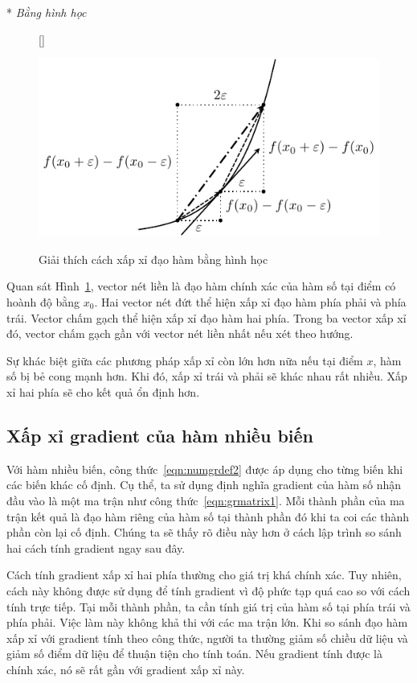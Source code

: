 \newpage
* \textit{Bằng hình học }

\begin{figure}[t]
[\FBwidth]
{\caption{
Giải thích cách xấp xỉ đạo hàm bằng hình học
}
\label{fig:explain_numgrad}}
{ %
\includegraphics[width=.6\textwidth]{Chapters/04_GradientDescent/GD/latex/check_grad.pdf}
}
\end{figure}

Quan sát Hình~\ref{fig:explain_numgrad}, vector nét liền là đạo hàm {chính xác}
của hàm số tại điểm có hoành độ bằng $x_0$. Hai vector nét đứt thể hiện xấp xỉ
đạo hàm phía phải và phía trái. Vector chấm gạch thể hiện xấp xỉ đạo hàm hai
phía. Trong ba vector xấp xỉ đó, vector chấm gạch gần với vector nét liền nhất
nếu xét theo hướng.

Sự khác biệt giữa các phương pháp xấp xỉ còn lớn hơn nữa nếu tại điểm $x$, hàm số bị
{bẻ cong} mạnh hơn. Khi đó, xấp xỉ trái và phải sẽ khác nhau rất nhiều.
Xấp xỉ hai phía sẽ cho kết quả ổn định hơn.


\subsection{Xấp xỉ gradient của hàm nhiều biến}

Với hàm nhiều biến, công thức~\eqref{eqn:numgrdef2} được áp dụng cho từng biến
khi các biến khác cố định. Cụ thể, ta sử dụng định nghĩa gradient của hàm số nhận
đầu vào là một ma trận như công thức~\eqref{eqn:grmatrix1}. Mỗi thành phần của
ma trận kết quả là đạo hàm riêng của hàm số tại thành phần đó khi ta coi các thành
phần còn lại cố định. Chúng ta sẽ thấy rõ điều này hơn ở cách lập trình so sánh
hai cách tính gradient ngay sau đây.

Cách tính gradient xấp xỉ hai phía thường cho giá trị khá chính xác. Tuy nhiên,
cách này không được sử dụng để tính gradient vì độ phức tạp quá cao so với cách
tính trực tiếp. Tại mỗi thành phần, ta cần tính giá trị của hàm số tại phía trái
và phía phải. Việc làm này không khả thi với các ma trận lớn. Khi so sánh đạo
hàm xấp xỉ với gradient tính theo công thức, người ta thường giảm số chiều dữ
liệu và giảm số điểm dữ liệu để thuận tiện cho tính toán. Nếu gradient tính được
là chính xác, nó sẽ rất gần với gradient xấp xỉ này.

